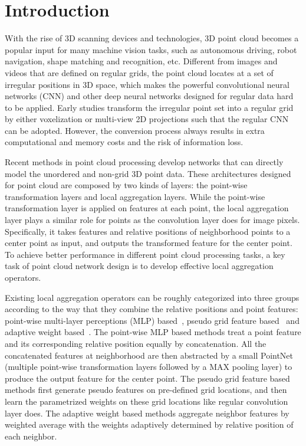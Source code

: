 \documentclass[runningheads]{llncs}
\begin{document}
\section{Introduction}

With the rise of 3D scanning devices and technologies, 3D point cloud becomes a popular input for many machine vision tasks, such as autonomous driving, robot navigation, shape matching and recognition, etc. Different from images and videos that are defined on regular grids, the point cloud locates at a set of irregular positions in 3D space, which makes the powerful convolutional neural networks (CNN) and other deep neural networks designed for regular data hard to be applied. Early studies transform the irregular point set into a regular grid by either voxelization or multi-view 2D projections such that the regular CNN can be adopted. However, the conversion process always results in extra computational and memory costs and the risk of information loss.

Recent methods in point cloud processing develop networks that can directly model the unordered and non-grid 3D point data. These architectures designed for point cloud are composed by two kinds of layers: the point-wise transformation layers and local aggregation layers. While the point-wise transformation layer is applied on features at each point, the local aggregation layer plays a similar role for points  as the convolution layer does for image pixels. Specifically, it takes features and relative positions of neighborhood points to a center point as input, and outputs the transformed feature for the center point. To achieve better performance in different point cloud processing tasks, a key task of point cloud network design is to develop effective local aggregation operators.

Existing local aggregation operators can be roughly categorized into three groups according to the way that they combine the relative positions and point features: point-wise multi-layer perceptions (MLP) based~\cite{qi2017pointnet++,wang2019dynamic,li2019can,komarichev2019cnn}, pseudo grid feature based~\cite{hua2018pointwise,mao2019interpolated,zhang2019shellnet,lan2019modeling,tatarchenko2018tangent,thomas2019kpconv} and adaptive weight based~\cite{wang2018paramconv,groh2018flex,liu2019rscnn,wu2019pointconv,wang2019graph,li2018pointcnn}. The point-wise MLP based methods treat a point feature and its corresponding relative position equally by concatenation. All the concatenated features at neighborhood are then abstracted by a small PointNet~\cite{qi2017pointnet} (multiple point-wise transformation layers followed by a MAX pooling layer) to produce the output feature for the center point. The pseudo grid feature based methods first generate pseudo features on pre-defined grid locations, and then learn the parametrized weights on these grid locations like regular convolution layer does. The adaptive weight based methods aggregate neighbor features by weighted average with the weights adaptively determined by relative position of each neighbor.
\end{document}
